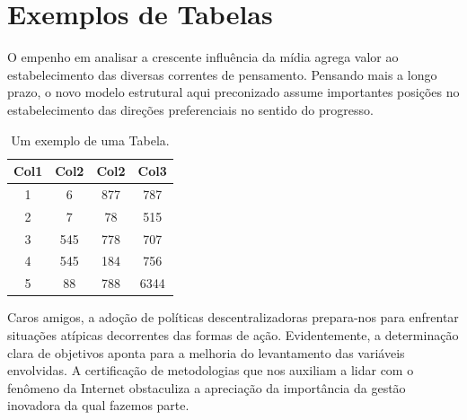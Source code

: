 \documentclass[fleqn]{profmat-cefet}
\begin{document}
\chapter{Exemplos de Tabelas}
\label{cap:exemplos_de_tabelas}

O empenho em analisar a crescente influência da mídia agrega valor ao
estabelecimento das diversas correntes de pensamento. Pensando mais a longo
prazo, o novo modelo estrutural aqui preconizado assume importantes posições no
estabelecimento das direções preferenciais no sentido do progresso. 

\begin{table}
  \begin{center}
    \caption{Um exemplo de uma Tabela.}
    \label{tab:exemplo_tabela}
    \begin{tabular}{||c c c c||}
      \hline
      Col1 & Col2 & Col2 & Col3 \\[0.5ex] \hline\hline
       1   & 6    & 877  & 787  \\ \hline
       2   & 7    & 78   & 515  \\ \hline
       3   & 545  & 778  & 707  \\ \hline
       4   & 545  & 184  & 756  \\ \hline
       5   & 88   & 788  & 6344 \\[1ex] \hline
    \end{tabular}
  \end{center}
\end{table}

Caros amigos, a adoção de políticas descentralizadoras prepara-nos para enfrentar
situações atípicas decorrentes das formas de ação. Evidentemente, a determinação
clara de objetivos aponta para a melhoria do levantamento das variáveis
envolvidas. A certificação de metodologias que nos auxiliam a lidar com o
fenômeno da Internet obstaculiza a apreciação da importância da gestão inovadora
da qual fazemos parte. 
\end{document}
